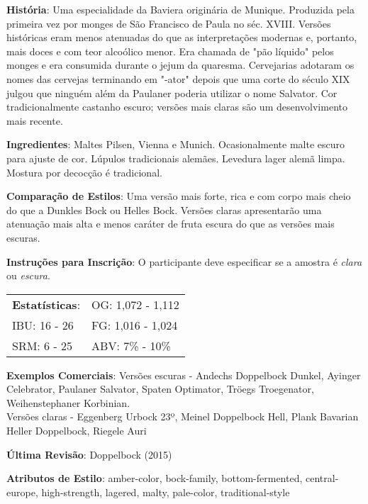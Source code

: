 \textbf{História}: Uma especialidade da Baviera originária de Munique. Produzida pela primeira vez por monges de São Francisco de Paula no séc. XVIII. Versões históricas eram menos atenuadas do que as interpretações modernas e, portanto, mais doces e com teor alcoólico menor. Era chamada de "pão líquido" pelos monges e era consumida durante o jejum da quaresma. Cervejarias adotaram os nomes das cervejas terminando em "-ator" depois que uma corte do século XIX julgou que ninguém além da Paulaner poderia utilizar o nome Salvator. Cor tradicionalmente castanho escuro; versões mais claras são um desenvolvimento mais recente.

\textbf{Ingredientes}: Maltes Pilsen, Vienna e Munich. Ocasionalmente malte escuro para ajuste de cor. Lúpulos tradicionais alemães. Levedura lager alemã limpa. Mostura por decocção é tradicional.

\textbf{Comparação de Estilos}: Uma versão mais forte, rica e com corpo mais cheio do que a Dunkles Bock ou Helles Bock. Versões claras apresentarão uma atenuação mais alta e menos caráter de fruta escura do que as versões mais escuras.

\textbf{Instruções para Inscrição}: O participante deve especificar se a amostra é \textit{clara} ou \textit{escura}.

\begin{tabular}{@{}p{35mm}p{35mm}@{}}
  \textbf{Estatísticas}: & OG: 1,072 - 1,112 \\
  IBU: 16 - 26 & FG: 1,016 - 1,024 \\
  SRM: 6 - 25 & ABV: 7\% - 10\%
\end{tabular}

\textbf{Exemplos Comerciais}: Versões escuras - Andechs Doppelbock Dunkel, Ayinger Celebrator, Paulaner Salvator, Spaten Optimator, Tröegs Troegenator, Weihenstephaner Korbinian.\\
Versões claras - Eggenberg Urbock 23º, Meinel Doppelbock Hell, Plank Bavarian Heller Doppelbock, Riegele Auri

\textbf{Última Revisão}: Doppelbock (2015)

\textbf{Atributos de Estilo}: amber-color, bock-family, bottom-fermented, central-europe, high-strength, lagered, malty, pale-color, traditional-style
